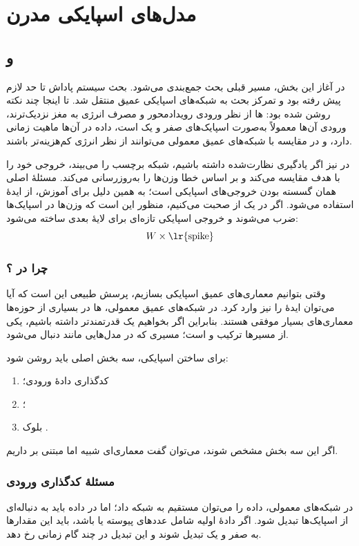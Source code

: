 \chapter{مدل‌های اسپایکی مدرن}

\section{ و }
در آغاز این بخش، مسیر قبلی بحث جمع‌بندی می‌شود. بحث سیستم پاداش تا حد لازم پیش رفته بود و تمرکز بحث به شبکه‌های اسپایکی عمیق منتقل شد. تا اینجا چند نکته روشن شده بود: ها از نظر ورودی رویدادمحور و مصرف انرژی به مغز نزدیک‌ترند، ورودی آن‌ها معمولاً به‌صورت اسپایک‌های صفر و یک است، داده در آن‌ها ماهیت زمانی دارد، و در مقایسه با شبکه‌های عمیق معمولی می‌توانند از نظر انرژی کم‌هزینه‌تر باشند.

در  نیز اگر یادگیری نظارت‌شده داشته باشیم، شبکه برچسب را می‌بیند، خروجی خود را با هدف مقایسه می‌کند و بر اساس خطا وزن‌ها را به‌روزرسانی می‌کند. مسئلهٔ اصلی همان گسسته بودن خروجی‌های اسپایکی است؛ به همین دلیل برای آموزش، از ایدهٔ  استفاده می‌شود. اگر در یک  از  صحبت می‌کنیم، منظور این است که وزن‌ها در اسپایک‌ها ضرب می‌شوند و خروجی اسپایکی تازه‌ای برای لایهٔ بعدی ساخته می‌شود:
\[
W \times \text{\lr{spike}}
\]

\subsection{چرا  در ؟}
وقتی بتوانیم معماری‌های عمیق اسپایکی بسازیم، پرسش طبیعی این است که آیا می‌توان ایدهٔ  را نیز وارد  کرد. در شبکه‌های عمیق معمولی، ها در بسیاری از حوزه‌ها معماری‌های بسیار موفقی هستند. بنابراین اگر بخواهیم یک  قدرتمندتر داشته باشیم، یکی از مسیرها ترکیب  و  است؛ مسیری که در مدل‌هایی مانند  دنبال می‌شود.

برای ساختن  اسپایکی، سه بخش اصلی باید روشن شود:
\begin{enumerate}
  \item کدگذاری دادهٔ ورودی؛
  \item {}؛
  \item بلوک .
\end{enumerate}
اگر این سه بخش مشخص شوند، می‌توان گفت معماری‌ای شبیه  اما مبتنی بر  داریم.

\subsection{مسئلهٔ کدگذاری ورودی}
در شبکه‌های معمولی، داده را می‌توان مستقیم به شبکه داد؛ اما در  داده باید به دنباله‌ای از اسپایک‌ها تبدیل شود. اگر دادهٔ اولیه شامل عددهای پیوسته یا  باشد، باید این مقدارها به صفر و یک تبدیل شوند و این تبدیل در چند گام زمانی رخ دهد.

